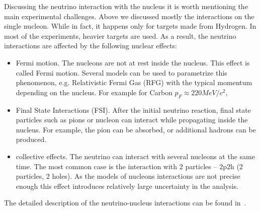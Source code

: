 \documentclass[../main.tex]{subfiles}
\begin{document}
Discussing the neutrino interaction with the nucleus it is worth mentioning the main experimental challenges. Above we discussed mostly the interactions on the single nucleon. While in fact, it happens only for targets made from Hydrogen. In most of the experiments, heavier targets are used. As a result, the neutrino interactions are affected by the following nuclear effects:
\begin{itemize}
  \item Fermi motion. The nucleons are not at rest inside the nucleus. This effect is called Fermi motion. Several models can be used to parametrize this phenomenon, e.g. Relativistic Fermi Gas (RFG) with the typical momentum depending on the nucleus. For example for Carbon $p_F\approx 220 MeV/c^2$,
  \item Final State Interactions (FSI). After the initial neutrino reaction, final state particles such as pions or nucleon can interact while propagating inside the nucleus. For example, the pion can be absorbed, or additional hadrons can be produced.
  \item collective effects. The neutrino can interact with several nucleons at the same time. The most common case is the interaction with 2 particles -- 2p2h (2 particles, 2 holes). As the models of nucleons interactions are not precise enough this effect introduces relatively large uncertainty in the analysis.
\end{itemize}

The detailed description of the neutrino-nucleus interactions can be found in~\cite{Formaggio2012}.



\end{document}
